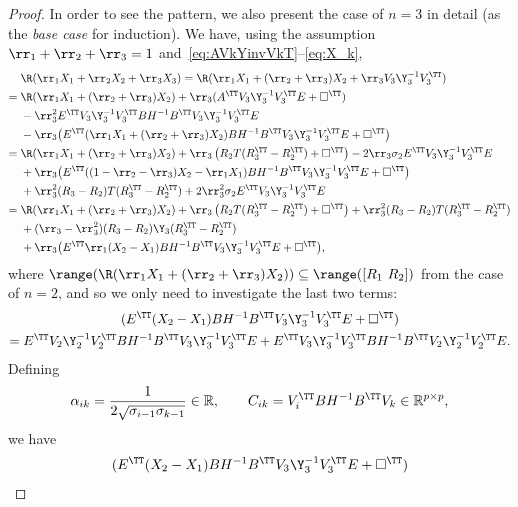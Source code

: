 \begin{proof}
In order to see the pattern, we also present the case of $n=3$ in detail (as the \emph{base case}
for induction).
We have, using the assumption $\rr_1+\rr_2+\rr_3=1$ and~\eqref{eq:AVkYinvVkT}--\eqref{eq:X_k},
\begin{align*}
	& \R(\rr_1X_1 + \rr_2X_2 + \rr_3X_3) = \R(\rr_1X_1 + (\rr_2+\rr_3)X_2 +
	\rr_3V_3\Y_3^{-1}V_3^\TT)
	\\
	={}& \R(\rr_1X_1 + (\rr_2+\rr_3)X_2) + \rr_3(A^\TT V_3\Y_3^{-1}V_3^\TT E + \square^\TT)\\
	&- \rr_3^2 E^\TT V_3\Y_3^{-1}V_3^\TT BH^{-1}B^\TT V_3\Y_3^{-1}V_3^\TT E\\
	&-\rr_3\big(E^\TT(\rr_1 X_1+(\rr_2+\rr_3)X_2)BH^{-1}B^\TT V_3\Y_3^{-1}V_3^\TT E+\square^\TT\big)
	\\
	={}& \R(\rr_1X_1 + (\rr_2+\rr_3)X_2) + \rr_3\left(R_{2}T(R_3^\TT-R_{2}^\TT) +\square^\TT\right)
	- 2\rr_3\sigma_2 E^\TT V_3\Y_3^{-1}V_3^\TT E\\
	&+ \rr_3\big(E^\TT((1-\rr_2-\rr_3)X_2-\rr_1X_1)BH^{-1}B^\TT V_3\Y_3^{-1}V_3^\TT E
	+\square^\TT\big) \\
	&+ \rr_3^2(R_3-R_{2})T(R_3^\TT-R_{2}^\TT) +
	2\rr_3^2\sigma_2E^\TT V_3\Y_3^{-1}V_3^\TT E
	\\
	={}& \R(\rr_1X_1 + (\rr_2+\rr_3)X_2) + \rr_3\left(R_{2}T(R_3^\TT-R_{2}^\TT) +\square^\TT\right) + \rr_3^2(R_3-R_{2})T(R_3^\TT-R_{2}^\TT) \\
	&+ (\rr_3-\rr_3^2)(R_3-R_{2})\Y_3(R_3^\TT-R_{2}^\TT)\\
	&+ \rr_3\big(E^\TT\rr_1(X_2-X_1)BH^{-1}B^\TT V_3\Y_3^{-1}V_3^\TT E+\square^\TT\big),
\end{align*}
where $\range (\R(\rr_1X_1 + (\rr_2+\rr_3)X_2))\subseteq \range([R_1\ R_2])$ from the case of $n=2$, and so we only need to investigate the last two terms:
\begin{multline*}%
	(E^\TT(X_2-X_1)BH^{-1}B^\TT V_3\Y_3^{-1}V_3^\TT E+\square^\TT) \\
	=E^\TT V_2\Y_2^{-1}V_2^\TT BH^{-1}B^\TT V_3\Y_3^{-1}V_3^\TT E
	  + E^\TT V_3\Y_3^{-1}V_3^\TT BH^{-1}B^\TT V_2\Y_2^{-1}V_2^\TT E.
\end{multline*}
Defining
\begin{equation}\label{eq:alpha-Cik}
	\alpha_{ik}=
	\frac{1}{2\sqrt{\sigma_{i-1}\sigma_{k-1}}}\in\mathbb{R},\qquad
	C_{ik} = V_i^\TT B H^{-1}B^\TT V_k \in\mathbb{R}^{p\times p},
\end{equation}
we have
\begin{multline*}
	(E^\TT(X_2-X_1)BH^{-1}B^\TT V_3\Y_3^{-1}V_3^\TT E + \square^\TT)

\end{multline*}
\end{proof}

